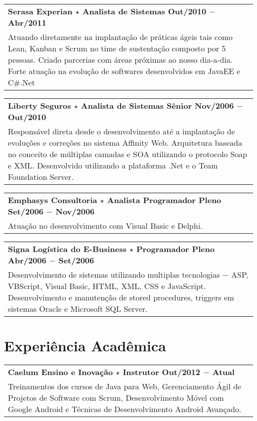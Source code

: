\documentclass[a4paper, oneside, final]{scrartcl}
\newcommand{\vspc}{\vspace{0.15cm}} %
\begin{document}
\begin{center}
\begin{tabularx}{1\linewidth}{X}
{\bf Serasa Experian $\star$  Analista de Sistemas \hfill Out/2010 $-$ Abr/2011} \\
Atuando diretamente na implantação de práticas ágeis tais como Lean, Kanban e Scrum no time de sustentação composto por 5 pessoas. Criado parcerias com áreas próximas ao nosso dia-a-dia. Forte atuação na evolução de softwares desenvolvidos em JavaEE e C\#.Net \vspc\\
\end{tabularx}

\begin{tabularx}{1\linewidth}{X}
{\bf Liberty Seguros $\star$ Analista de Sistemas Sênior \hfill Nov/2006 $-$ Out/2010} \\
Responsável direta desde o desenvolvimento até a implantação de evoluções e correções no sistema Affinity Web. Arquitetura baseada no conceito de múltiplas camadas e SOA utilizando o protocolo Soap e XML. Desenvolvido utilizando a plataforma .Net e o Team Foundation Server.\vspc\\
\end{tabularx}

\begin{tabularx}{1\linewidth}{X}
{\bf Emphasys Consultoria $\star$ Analista Programador Pleno  \hfill Set/2006 $-$ Nov/2006} \\
Atuação no desenvolvimento com Visual Basic e Delphi. \vspc\\
\end{tabularx}

\begin{tabularx}{1\linewidth}{X}
{\bf Signa Logística do E-Business $\star$ Programador Pleno  \hfill Abr/2006 $-$ Set/2006} \\
Desenvolvimento de sistemas utilizando multiplas tecnologias $-$ ASP, VBScript, Visual Basic, HTML, XML, CSS e JavaScript. Desenvolvimento e manutenção de stored procedures, triggers em sistemas Oracle e Microsoft SQL Server. \vspc\\
\end{tabularx}

\section{Experiência Acadêmica}
\begin{tabularx}{1\linewidth}{X}
{\bf Caelum Ensino e Inovação $\star$ Instrutor  \hfill Out/2012 $-$ Atual} \\
Treinamentos dos cursos de Java para Web, Gerenciamento Ágil de Projetos de Software com Scrum, Desenvolvimento Móvel com Google Android e Técnicas de Desenvolvimento Android Avançado. \vspc\\
\end{tabularx}


\end{center}
\end{document}

